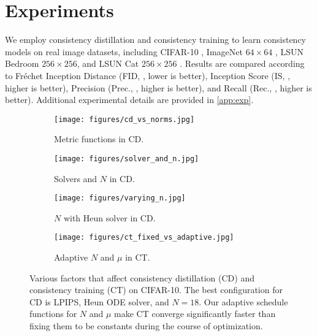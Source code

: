 \section{Experiments}\label{sec:experiments}
We employ consistency distillation and consistency training to learn consistency models on real image datasets, including CIFAR-10 \cite{krizhevsky2009learning}, ImageNet $64\times 64$ \cite{deng2009imagenet}, LSUN Bedroom $256\times 256$, and LSUN Cat $256\times 256$ \cite{yu2015lsun}. Results are compared according to Fr\'echet Inception Distance (FID, \citet{heusel2017gans}, lower is better), Inception Score (IS, \citet{salimans2016improved}, higher is better), Precision (Prec., \citet{kynkaanniemi2019improved}, higher is better), and Recall (Rec., \citet{kynkaanniemi2019improved}, higher is better). Additional experimental details are provided in \cref{app:exp}.

\begin{figure*}
    \centering
    \begin{subfigure}[b]{0.25\textwidth}
        \texttt{[image: figures/cd\_vs\_norms.jpg]}
        \caption{Metric functions in CD.}\label{fig:cd_compare}
    \end{subfigure}%
    \begin{subfigure}[b]{0.25\textwidth}
        \texttt{[image: figures/solver\_and\_n.jpg]}
        \caption{Solvers and $N$ in CD.}\label{fig:cd_solver}
    \end{subfigure}%
    \begin{subfigure}[b]{0.25\textwidth}
        \texttt{[image: figures/varying\_n.jpg]}
        \caption{$N$ with Heun solver in CD.}\label{fig:cd_n}
    \end{subfigure}%
    \begin{subfigure}[b]{0.25\textwidth}
        \texttt{[image: figures/ct\_fixed\_vs\_adaptive.jpg]}
        \caption{Adaptive $N$ and $\mu$ in CT.}\label{fig:ct_adaptive}
    \end{subfigure}
    \caption{Various factors that affect consistency distillation (CD) and consistency training (CT) on CIFAR-10. The best configuration for CD is LPIPS, Heun ODE solver, and $N=18$. Our adaptive schedule functions for $N$ and $\mu$ make CT converge significantly faster than fixing them to be constants during the course of optimization.}
    \label{fig:cd_ablation}
\end{figure*}

